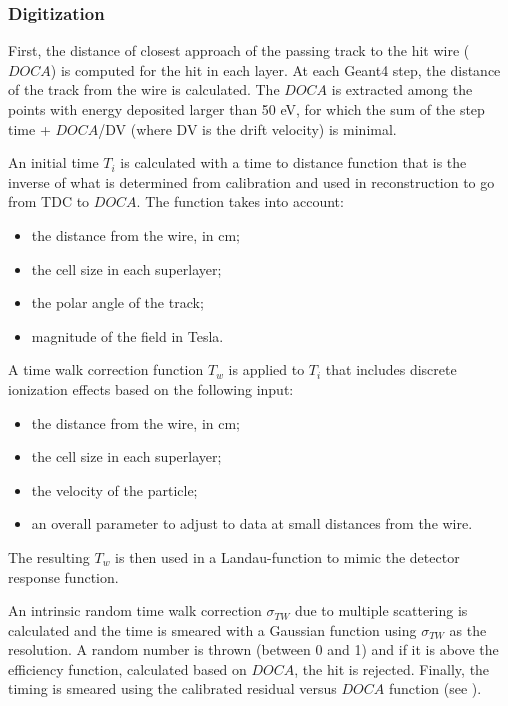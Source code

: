 \subsubsection{Digitization}

First, the distance of closest approach of the passing track to the hit wire ($DOCA$) is computed for the hit in each layer.
At each Geant4 step, the distance of the track from the wire is calculated.
The $DOCA$ is extracted among the points with energy deposited larger than 50 eV,
for which the sum of the step time + $DOCA$/DV (where DV is the drift velocity) is minimal.

An initial time $T_i$ is calculated with a time to distance function that is the inverse of
what is determined from calibration and used in reconstruction to go from TDC to $DOCA$.
The function takes into account:

\begin{itemize}
	\item the distance from the wire, in cm;
	\item the cell size in each superlayer;
	\item the polar angle of the track;
	\item magnitude of the field in Tesla.
\end{itemize}

A time walk correction function $T_w$ is applied to $T_i$ that includes discrete ionization effects based on the following input:

\begin{itemize}
	\item the distance from the wire, in cm;
	\item the cell size in each superlayer;
	\item the velocity of the particle;
	\item an overall parameter to adjust to data at small distances from the wire.
\end{itemize}

\noindent The resulting $T_w$ is then used in a Landau-function to mimic the detector response function.

An intrinsic random time walk correction $\sigma_{TW}$ due to multiple scattering is calculated and the time is smeared with
a Gaussian function using $\sigma_{TW}$ as the resolution.
A random number is thrown (between 0 and 1) and if it is above the efficiency function, calculated based on $DOCA$, the hit is rejected.
Finally, the timing is smeared using the calibrated residual versus $DOCA$ function (see ).

